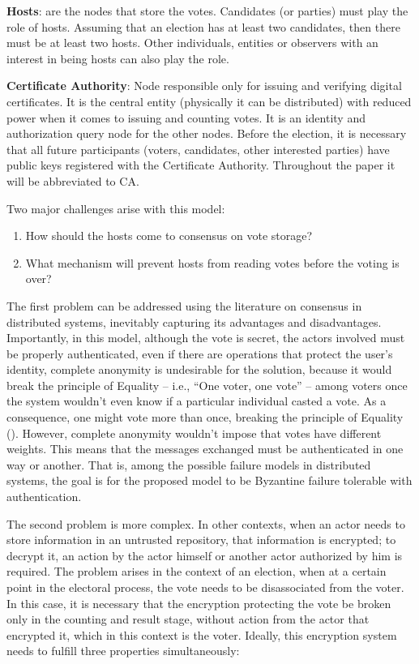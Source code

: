 \documentclass[english]{textolivre}
\begin{document}
\textbf{Hosts}: are the nodes that store the votes. Candidates (or parties) must play the role of hosts. Assuming that an election has at least two candidates, then there must be at least two hosts. Other individuals, entities or observers with an interest in being hosts can also play the role.

\textbf{Certificate Authority}: Node responsible only for issuing and verifying digital certificates. It is the central entity (physically it can be distributed) with reduced power when it comes to issuing and counting votes. It is an identity and authorization query node for the other nodes. Before the election, it is necessary that all future participants (voters, candidates, other interested parties) have public keys registered with the Certificate Authority. Throughout the paper it will be abbreviated to CA.

Two major challenges arise with this model:

\begin{enumerate}

\item How should the hosts come to consensus on vote storage?

\item What mechanism will prevent hosts from reading votes before the voting is over?

\end{enumerate}

The first problem can be addressed using the literature on consensus in distributed systems, inevitably capturing its advantages and disadvantages. Importantly, in this model, although the vote is secret, the actors involved must be properly authenticated, even if there are operations that protect the user's identity, complete anonymity is undesirable for the solution, because it would break the principle of Equality – i.e., “One voter, one vote” –  among voters once the system wouldn't even know if a particular individual casted a vote. As a consequence, one might vote more than once, breaking the principle of Equality (). However, complete anonymity wouldn't impose that votes have different weights. This means that the messages exchanged must be authenticated in one way or another. That is, among the possible failure models in distributed systems, the goal is for the proposed model to be Byzantine failure tolerable with authentication.

The second problem is more complex. In other contexts, when an actor needs to store information in an untrusted repository, that information is encrypted; to decrypt it, an action by the actor himself or another actor authorized by him is required. The problem arises in the context of an election, when at a certain point in the electoral process, the vote needs to be disassociated from the voter. In this case, it is necessary that the encryption protecting the vote be broken only in the counting and result stage, without action from the actor that encrypted it, which in this context is the voter. Ideally, this encryption system needs to fulfill three properties simultaneously:
\end{document}

